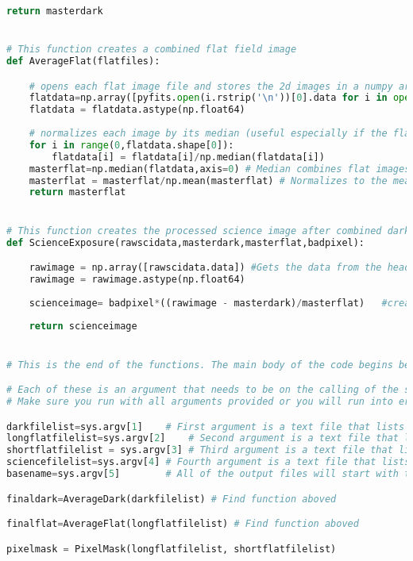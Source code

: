 \documentclass{aastex}
\begin{document}
\begin{lstlisting}[language=Python, caption= Cleans science images (YM)]
	return masterdark


# This function creates a combined flat field image
def AverageFlat(flatfiles):

	# opens each flat image file and stores the 2d images in a numpy array
	flatdata=np.array([pyfits.open(i.rstrip('\n'))[0].data for i in open(flatfiles)])
	flatdata = flatdata.astype(np.float64)
	
	# normalizes each image by its median (useful especially if the flats have very different count level):
	for i in range(0,flatdata.shape[0]):
		flatdata[i] = flatdata[i]/np.median(flatdata[i])
	masterflat=np.median(flatdata,axis=0) # Median combines flat images
	masterflat = masterflat/np.mean(masterflat) # Normalizes to the mean of the flats
	return masterflat


# This function creates the processed science image after combined dark, and flat images have been created.  
def ScienceExposure(rawscidata,masterdark,masterflat,badpixel):

	rawimage = np.array([rawscidata.data]) #Gets the data from the header of the science image file
	rawimage = rawimage.astype(np.float64)
	
	scienceimage= badpixel*((rawimage - masterdark)/masterflat)   #creates final science image
	
	return scienceimage


# This is the end of the functions. The main body of the code begins below.

# Each of these is an argument that needs to be on the calling of the script. 
# Make sure you run with all arguments provided or you will run into errors!

darkfilelist=sys.argv[1]    # First argument is a text file that lists the names of all dark current image file names
longflatfilelist=sys.argv[2]    # Second argument is a text file that lists the names of all of the long exposure flat field images
shortflatfilelist = sys.argv[3] # Third argument is a text file that lists the names of all of the short exposure flat field images
sciencefilelist=sys.argv[4] # Fourth argument is a text file that lists the names of all the science images
basename=sys.argv[5]        # All of the output files will start with the string value of basename. 

finaldark=AverageDark(darkfilelist) # Find function aboved

finalflat=AverageFlat(longflatfilelist) # Find function aboved

pixelmask = PixelMask(longflatfilelist, shortflatfilelist)


\end{lstlisting}
\end{document}
